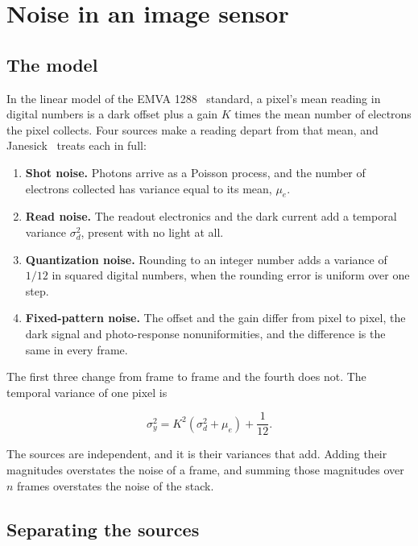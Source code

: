 \chapter{\texorpdfstring{Noise in an image sensor}{Noise in an image sensor}}
\label{chap:sensor-noise}

\section{\texorpdfstring{The model}{The model}}

In the linear model of the EMVA 1288~\cite{src:EMVA-1288} standard, a pixel's mean reading in digital numbers is a dark offset plus a gain \(K\) times the mean number of electrons the pixel collects. Four sources make a reading depart from that mean, and Janesick~\cite{src:Janesick-2007} treats each in full:

\begin{enumerate}
\item \textbf{Shot noise.} Photons arrive as a Poisson process, and the number of electrons collected has variance equal to its mean, \(\mu_e\).
\item \textbf{Read noise.} The readout electronics and the dark current add a temporal variance \(\sigma_d^2\), present with no light at all.
\item \textbf{Quantization noise.} Rounding to an integer number adds a variance of \(1/12\) in squared digital numbers, when the rounding error is uniform over one step.
\item \textbf{Fixed-pattern noise.} The offset and the gain differ from pixel to pixel, the dark signal and photo-response nonuniformities, and the difference is the same in every frame.
\end{enumerate}

The first three change from frame to frame and the fourth does not. The temporal variance of one pixel is

\[
\sigma_y^2 = K^2\left(\sigma_d^2 + \mu_e\right) + \frac{1}{12}.
\]

The sources are independent, and it is their variances that add. Adding their magnitudes overstates the noise of a frame, and summing those magnitudes over \(n\) frames overstates the noise of the stack.

\section{\texorpdfstring{Separating the sources}{Separating the sources}}

